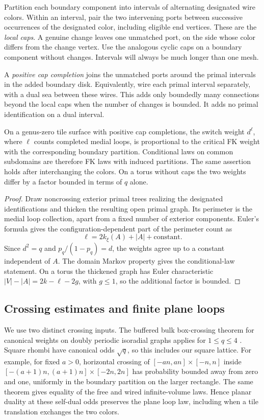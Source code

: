 Partition each boundary component into intervals of alternating designated
wire colors. Within an interval, pair the two intervening ports between
successive occurrences of the designated color, including eligible end
vertices. These are the \emph{local caps}. A genuine change leaves one
unmatched port, on the side whose color differs from the change vertex.
Use the analogous cyclic caps on a boundary component without changes.
Intervals will always be much longer than one mesh.

A \emph{positive cap completion} joins the unmatched ports around the primal
intervals in the added boundary disk. Equivalently, wire each primal
interval separately, with a dual sea between these wires. This adds only
boundedly many connections beyond the local caps when the number of changes
is bounded. It adds no primal identification on a dual interval.

\begin{lemma}\label{prelim:loop-law}
On a genus-zero tile surface with positive cap completions, the switch
weight $d^\ell$, where $\ell$ counts completed medial loops, is proportional
to the critical FK weight with the corresponding boundary partition.
Conditional laws on common subdomains are therefore FK laws with induced
partitions. The same assertion holds after interchanging the colors.
On a torus without caps the two weights differ by a factor bounded in terms
of $q$ alone.
\end{lemma}

\begin{proof}
Draw noncrossing exterior primal trees realizing the designated
identifications and thicken the resulting open primal graph. Its perimeter
is the medial loop collection, apart from a fixed number of exterior
components. Euler's formula gives the configuration-dependent part of the
perimeter count as
\[
 \ell=2k_\xi(A)+|A|+\text{constant}.
\]
Since $d^2=q$ and $p_q/(1-p_q)=d$, the weights agree up to a constant
independent of $A$. The domain Markov property gives the conditional-law
statement. On a torus the thickened graph has Euler characteristic
$|V|-|A|=2k-\ell-2g$, with $g\le1$, so the additional factor is bounded.
\end{proof}
\subsection{Crossing estimates and finite plane loops}

We use two distinct crossing inputs. The buffered bulk box-crossing theorem
for canonical weights on doubly periodic isoradial graphs applies for
$1\le q\le4$ \citep[Theorem~1.1]{DCLM2019Isoradial}. Square rhombi have
canonical odds $\sqrt q$, so this includes our square lattice. For example,
for fixed $a>0$, horizontal crossing of
$[-an,an]\times[-n,n]$ inside
$[-(a+1)n,(a+1)n]\times[-2n,2n]$ has probability bounded away from zero
and one, uniformly in the boundary partition on the larger rectangle.
The same theorem gives equality of the free and wired infinite-volume
laws. Hence planar duality at these self-dual odds preserves the plane
loop law, including when a tile translation exchanges the two colors.

